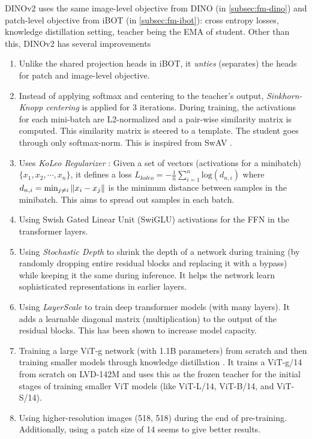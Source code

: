 DINOv2 uses the same image-level objective from DINO (in
\cref{subsec:fm-dino}) and patch-level objective from iBOT (in
\cref{subsec:fm-ibot}): cross entropy losses, knowledge distillation
setting, teacher being the EMA of student. Other than this, DINOv2
has several improvements

\begin{enumerate}
    \item Unlike the shared projection heads in iBOT, it \emph{unties}
        (separates) the heads for patch and image-level objective.
    \item Instead of applying softmax and centering to the teacher's
        output, \emph{Sinkhorn-Knopp centering} is applied for 3
        iterations. During training, the activations for each
        mini-batch are L2-normalized and a pair-wise similarity matrix
        is computed. This similarity matrix is steered to a template.
        The student goes through only softmax-norm. This is inspired
        from SwAV \cite{Caron2020UnsupervisedLO}.
    \item Uses \emph{KoLeo Regularizer}
        \cite{Sablayrolles2018SpreadingVF}: Given a set of vectors
        (activations for a minibatch) $\{x_1, x_2, \cdots, x_n\}$, it
        defines a loss $L_{koleo} = -\frac{1} {n} \sum_{i=1}^n
        \mathrm{log}(d_{n, i})$ where $d_{n, i} = \textup{min}_{j \neq
        i} \left\|x_i - x_j\right\|$ is the minimum distance between
        samples in the minibatch. This aims to spread out samples in
        each batch.
    \item Using Swish Gated Linear Unit (SwiGLU) activations
        \cite{Shazeer2020GLUVI} for the FFN in the transformer layers.
    \item Using \emph{Stochastic Depth} \cite{Huang2016DeepNW} to
        shrink the depth of a network during training (by randomly
        dropping entire residual blocks and replacing it with a
        bypass) while keeping it the same during inference. It helps
        the network learn sophisticated representations in earlier
        layers.
    \item Using \emph{LayerScale} \cite{Touvron2021GoingDW} to train
        deep transformer models (with many layers). It adds a
        learnable diagonal matrix (multiplication) to the output of
        the residual blocks. This has been shown to increase model
        capacity.
    \item Training a large ViT-g network (with 1.1B parameters) from
        scratch and then training smaller models through knowledge
        distillation \cite{Hinton2015DistillingTK}. It trains a
        ViT-g/14 from scratch on LVD-142M and uses this as the frozen
        teacher for the initial stages of training smaller ViT models
        (like ViT-L/14, ViT-B/14, and ViT-S/14).
    \item Using higher-resolution images (518, 518) during the end of
        pre-training. Additionally, using a patch size of 14 seems to
        give better results.
\end{enumerate}

